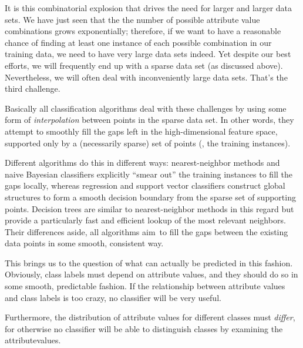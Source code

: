 It is this combinatorial explosion that drives the need for larger and
larger data sets. We have just seen that the the number of possible
attribute value combinations grows exponentially; therefore, if we
want to have a reasonable chance of finding at least one instance of
each possible combination in our training data, we need to have very
large data sets indeed. Yet despite our best efforts, we will
frequently end up with a sparse data set (as discussed above).
Nevertheless, we will often deal with inconveniently large data sets.
That's the third challenge.


Basically all classification algorithms deal with these challenges by
using some form of \emph{interpolation} between points in the sparse
data set. In other words, they attempt to smoothly fill the gaps left
in the high-dimensional feature space, supported only by a
(necessarily sparse) set of points (\ie, the training instances).

Different algorithms do this in different ways: nearest-neighbor
methods and naive Bayesian classifiers explicitly ``smear out'' the
training instances to fill the gaps locally, whereas regression and
support vector classifiers construct global structures to form a
smooth decision boundary from the sparse set of supporting points.
Decision trees are similar to nearest-neighbor methods in this regard
but provide a particularly fast and efficient lookup of the most
relevant neighbors.  Their differences aside, all algorithms aim~to
fill the gaps between the existing data points in some smooth,
consistent way.



This brings us to the question of what can actually be predicted in
this fashion.  Obviously, class labels must depend on attribute
values, and they should do so in some smooth, predictable fashion.  If
the relationship between attribute values and class labels is too
crazy, no classifier will be very useful.

Furthermore, the distribution of attribute values for different
classes must \emph{differ}, for otherwise no classifier will be able
to distinguish classes by examining the attribute\break values.

